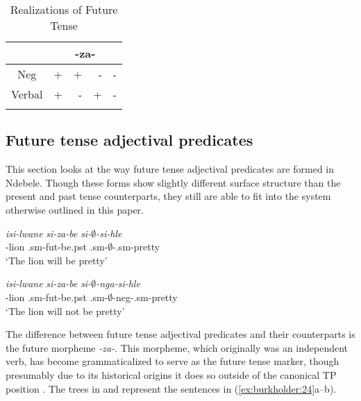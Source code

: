 \documentclass[output=paper]{langsci/langscibook}
\begin{document}
\begin{table}
\caption{Realizations of Future Tense} %
\centering %
\begin{tabular}{c rrrr} %
\lsptoprule%
 &\multicolumn{4}{c}{-za-} \\ %
\midrule%
Neg & + & + & - & -\\ %
Verbal & + & - & +& -\\[1ex] %
\lspbottomrule%
\end{tabular} 
\label{tab:burkholder:8}
\end{table} 


\subsection{Future tense adjectival predicates}

This section looks at the way future tense adjectival predicates are formed in Ndebele. Though these forms show slightly different surface structure than the present and past tense counterparts, they still are able to fit into the system otherwise outlined in this paper.


\begin{exe}
\ex\label{ex:burkholder:24} \begin{xlist}
\ex\label{ex:burkholder:24a} \gll \textit{isi-lwane} \textit{si-za-be} \textit{si-$\emptyset$-si-hle}\\
       -lion .{\sc sm}-{\sc fut}-be.{\sc pst} .{\sc sm}-$\emptyset$-.{\sc sm}-pretty\\
    \glt `The lion will be pretty' 

\ex\label{ex:burkholder:24b} \gll \textit{isi-lwane} \textit{si-za-be} \textit{si-$\emptyset$-nga-si-hle}\\
       -lion .{\sc sm}-{\sc fut}-be.{\sc pst} .{\sc sm}-$\emptyset$-{\sc neg}-.{\sc sm}-pretty\\
    \glt `The lion will not be pretty' 
\end{xlist}
\end{exe}

The difference between future tense adjectival predicates and their counterparts is the future morpheme \textit{-za-}. This morpheme, which originally was an independent verb, has become grammaticalized to serve as the future tense marker, though presumably due to its historical origins it does so outside of the canonical TP position \citep{Sibanda2004}. The trees in  and  represent the sentences in (\ref{ex:burkholder:24}a--b).
\end{document}
